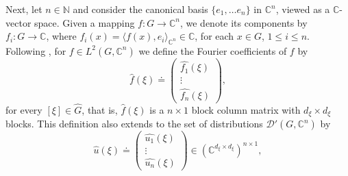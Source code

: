 \documentclass[11pt]{amsart}
\numberwithin{theorem}{section}
\numberwithin{equation}{section}
\theoremstyle{definition}
\numberwithin{example}{section}
\newtheorem{lemma}[theorem]{Lemma}
\theoremstyle{definition}
\theoremstyle{definition}
\newcommand{\N}{\mathbb{N}}
\newcommand{\C}{\mathbb{C}}
\begin{document}

Next, let $n\in\N$ and consider the canonical basis $\{e_1,\dots e_n\}$ in $\mathbb{C}^n$, viewed as a $\C$-vector space. Given a mapping $f:G\to \C^n$, we denote its components by $f_i:G\to \mathbb{C}$, 
 where $f_i(x)=\langle f(x),e_{i}\rangle_{\C^n}\in\mathbb{C}$, for each $x\in G$, $1\leq i\leq n$. Following \cite{HomoVector}, for $f\in L^2(G,\C^n)$ we define the Fourier coefficients of $f$ by 
 \begin{equation*}
     \widehat{f}(\xi)\doteq\begin{pmatrix}
         \widehat{f_1}(\xi)\\\vdots\\ \widehat{f_n}(\xi)
     \end{pmatrix},
 \end{equation*}
 for every $[\xi]\in\widehat{G}$, that is, $\widehat{f}(\xi)$ is a $n\times 1$ block column matrix with $d_\xi\times d_\xi$ blocks. This definition also extends to the set of distributions $\mathcal{D}'(G,\C^n)$ by  
 \begin{equation*}
  \widehat{u}(\xi)\doteq \begin{pmatrix}
      \widehat{u_1}(\xi)\\
      \vdots \\
      \widehat{u_n}(\xi)
  \end{pmatrix}\in (\mathbb{C}^{d_\xi\times d_\xi})^{n\times 1},
 \end{equation*}
\end{document}
